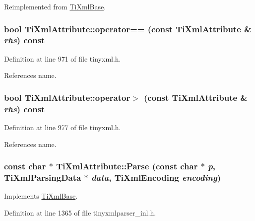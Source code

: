 Reimplemented from \hyperlink{class_ti_xml_base_a183315aa6f1bb36d509b179e912cb93f}{TiXmlBase}.\hypertarget{class_ti_xml_attribute_ae48c2a65b520d453914ce4e845d607cf}{
\subsubsection[{operator==}]{\setlength{\rightskip}{0pt plus 5cm}bool TiXmlAttribute::operator== (const {\bf TiXmlAttribute} \& {\em rhs}) const}}
\label{class_ti_xml_attribute_ae48c2a65b520d453914ce4e845d607cf}


Definition at line 971 of file tinyxml.h.

References name.\hypertarget{class_ti_xml_attribute_a867562769ef9778c1690cd373246b05b}{
\subsubsection[{operator$>$}]{\setlength{\rightskip}{0pt plus 5cm}bool TiXmlAttribute::operator$>$ (const {\bf TiXmlAttribute} \& {\em rhs}) const}}
\label{class_ti_xml_attribute_a867562769ef9778c1690cd373246b05b}


Definition at line 977 of file tinyxml.h.

References name.\hypertarget{class_ti_xml_attribute_ad62774421b814894b995af3b5d231dda}{
\subsubsection[{Parse}]{\setlength{\rightskip}{0pt plus 5cm}const char $\ast$ TiXmlAttribute::Parse (const char $\ast$ {\em p}, \/  {\bf TiXmlParsingData} $\ast$ {\em data}, \/  {\bf TiXmlEncoding} {\em encoding})}}
\label{class_ti_xml_attribute_ad62774421b814894b995af3b5d231dda}


Implements \hyperlink{class_ti_xml_base_a00e4edb0219d00a1379c856e5a1d2025}{TiXmlBase}.

Definition at line 1365 of file tinyxmlparser\_\-inl.h.

